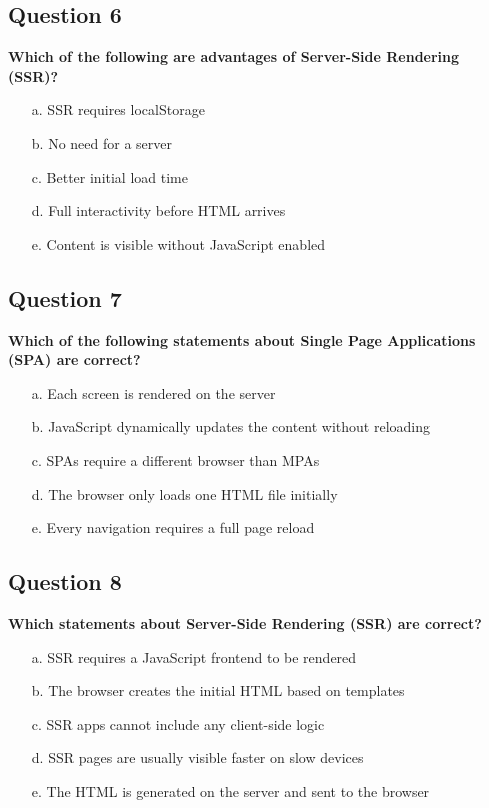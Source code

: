 \documentclass{article}
\begin{document}
\subsection*{Question 6}
\textbf{Which of the following are advantages of Server-Side Rendering (SSR)?}

\begin{itemize}
  \item[a.] SSR requires localStorage
  \item[b.] No need for a server
  \item[c.] Better initial load time
  \item[d.] Full interactivity before HTML arrives
  \item[e.] Content is visible without JavaScript enabled
\end{itemize}

\subsection*{Question 7}
\textbf{Which of the following statements about Single Page Applications (SPA) are correct?}

\begin{itemize}
  \item[a.] Each screen is rendered on the server
  \item[b.] JavaScript dynamically updates the content without reloading
  \item[c.] SPAs require a different browser than MPAs
  \item[d.] The browser only loads one HTML file initially
  \item[e.] Every navigation requires a full page reload
\end{itemize}

\subsection*{Question 8}
\textbf{Which statements about Server-Side Rendering (SSR) are correct?}

\begin{itemize}
  \item[a.] SSR requires a JavaScript frontend to be rendered
  \item[b.] The browser creates the initial HTML based on templates
  \item[c.] SSR apps cannot include any client-side logic
  \item[d.] SSR pages are usually visible faster on slow devices
  \item[e.] The HTML is generated on the server and sent to the browser
\end{itemize}
\end{document}
